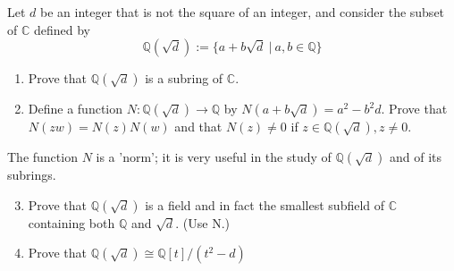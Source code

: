 \documentclass[12pt]{article}
\newenvironment{problem}[2][Problem]{\begin{trivlist}
\item[\hskip \labelsep {\bfseries #1}\hskip \labelsep {\bfseries #2.}]}{\end{trivlist}}
\theoremstyle{remark}
\begin{document}
\begin{problem}{4.10}
  Let $d$ be an integer that is not the square of an integer, and consider
  the subset of $\mathbb{C}$ defined by
  \begin{equation*}
    \mathbb{Q}(\sqrt{d}) := \{a+b\sqrt{d}\ |\ a,b\in\mathbb{Q}\}
  \end{equation*}
  \begin{enumerate}[label=(\alph*)]
    \item Prove that $\mathbb{Q}(\sqrt{d})$ is a subring of $\mathbb{C}$.
    \item Define a function $N : \mathbb{Q}(\sqrt{d})\to \mathbb{Q}$
      by $N(a+b\sqrt{d}) = a^2 - b^2d$.
      Prove that $N(zw) = N(z)N(w)$ and that $N(z)\neq0$ if 
      $z\in\mathbb{Q}(\sqrt{d}), z\neq0$.
  \end{enumerate}
  The function $N$ is a 'norm'; it is very useful in the study of 
  $\mathbb{Q}(\sqrt{d})$ and of its subrings.
  \begin{enumerate}[label=(\alph*)]
      \setcounter{enumi}{2}
    \item Prove that $\mathbb{Q}(\sqrt{d})$ is a field and in fact
      the smallest subfield of $\mathbb{C}$ containing both 
      $\mathbb{Q}$ and $\sqrt{d}$. (Use N.)
    \item Prove that $\mathbb{Q}(\sqrt{d})\cong\mathbb{Q}[t]/(t^2-d)$
  \end{enumerate}
\end{problem}
\end{document}
